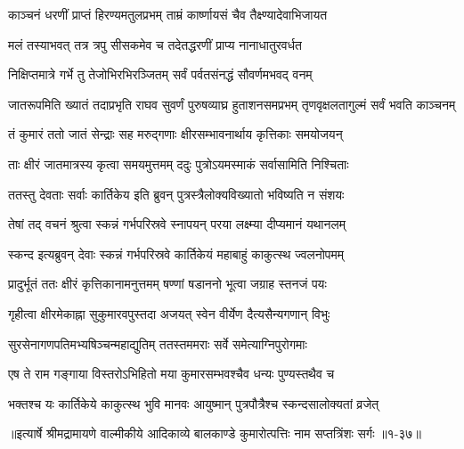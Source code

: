 \twolineshloka
{काञ्चनं धरणीं प्राप्तं हिरण्यमतुलप्रभम्}
{ताम्रं कार्ष्णायसं चैव तैक्ष्ण्यादेवाभिजायत} %

\twolineshloka
{मलं तस्याभवत् तत्र त्रपु सीसकमेव च}
{तदेतद्धरणीं प्राप्य नानाधातुरवर्धत} %

\twolineshloka
{निक्षिप्तमात्रे गर्भे तु तेजोभिरभिरञ्जितम्}
{सर्वं पर्वतसंनद्धं सौवर्णमभवद् वनम्} %

\threelineshloka
{जातरूपमिति ख्यातं तदाप्रभृति राघव}
{सुवर्णं पुरुषव्याघ्र हुताशनसमप्रभम्}
{तृणवृक्षलतागुल्मं सर्वं भवति काञ्चनम्} %

\twolineshloka
{तं कुमारं ततो जातं सेन्द्राः सह मरुद्गणाः}
{क्षीरसम्भावनार्थाय कृत्तिकाः समयोजयन्} %

\twolineshloka
{ताः क्षीरं जातमात्रस्य कृत्वा समयमुत्तमम्}
{ददुः पुत्रोऽयमस्माकं सर्वासामिति निश्चिताः} %

\twolineshloka
{ततस्तु देवताः सर्वाः कार्तिकेय इति ब्रुवन्}
{पुत्रस्त्रैलोक्यविख्यातो भविष्यति न संशयः} %

\twolineshloka
{तेषां तद् वचनं श्रुत्वा स्कन्नं गर्भपरिस्रवे}
{स्नापयन् परया लक्ष्म्या दीप्यमानं यथानलम्} %

\twolineshloka
{स्कन्द इत्यब्रुवन् देवाः स्कन्नं गर्भपरिस्रवे}
{कार्तिकेयं महाबाहुं काकुत्स्थ ज्वलनोपमम्} %

\twolineshloka
{प्रादुर्भूतं ततः क्षीरं कृत्तिकानामनुत्तमम्}
{षण्णां षडाननो भूत्वा जग्राह स्तनजं पयः} %

\twolineshloka
{गृहीत्वा क्षीरमेकाह्ना सुकुमारवपुस्तदा}
{अजयत् स्वेन वीर्येण दैत्यसैन्यगणान् विभुः} %

\twolineshloka
{सुरसेनागणपतिमभ्यषिञ्चन्महाद्युतिम्}
{ततस्तममराः सर्वे समेत्याग्निपुरोगमाः} %

\twolineshloka
{एष ते राम गङ्गाया विस्तरोऽभिहितो मया}
{कुमारसम्भवश्चैव धन्यः पुण्यस्तथैव च} %

\twolineshloka
{भक्तश्च यः कार्तिकेये काकुत्स्थ भुवि मानवः}
{आयुष्मान् पुत्रपौत्रैश्च स्कन्दसालोक्यतां व्रजेत्} %


॥इत्यार्षे श्रीमद्रामायणे वाल्मीकीये आदिकाव्ये बालकाण्डे कुमारोत्पत्तिः नाम सप्तत्रिंशः सर्गः ॥१-३७॥
